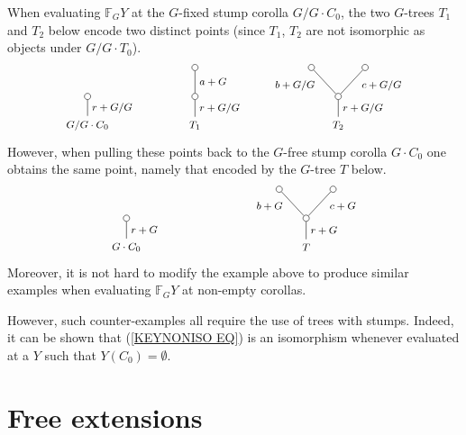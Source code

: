 \documentclass[a4paper,10pt]{article}%
\begin{document}
\begin{remark}
	When evaluating $\mathbb{F}_G Y$ at the $G$-fixed stump corolla $G/G \cdot C_0$, the two $G$-trees $T_1$ and $T_2$ below encode two distinct points (since $T_1$, $T_2$ are not isomorphic as objects under $G/G\cdot T_0$).
\[
\begin{tikzpicture}[grow=up,auto,level distance=2.3em,every node/.style = {font=\footnotesize},dummy/.style={circle,draw,inner sep=0pt,minimum size=1.75mm}]
	\node at (0,0) {$G/G \cdot C_0$}
		child{
			node [dummy] {}
		edge from parent node [swap] {$r+G/G$}};
	\node at (3,0) {$T_1$}
		child{node [dummy] {}
			child{node [dummy] {}
			edge from parent node [swap] {$a+G$}}
		edge from parent node [swap] {$r+G/G$}};
	\node at (7,0) {$T_2$}
		child{node [dummy] {}
			child{node [dummy] {}
			edge from parent node [swap,near end] {$c+G/G$}}
			child{node [dummy] {}
			edge from parent node [near end] {$b+G/G$}}
		edge from parent node [swap] {$r+G/G$}};
\end{tikzpicture}
\]
However, when pulling these points back to the $G$-free stump corolla $G \cdot C_0$ one obtains the same point, namely that encoded by the $G$-tree $T$ below.
\[
\begin{tikzpicture}[grow=up,auto,level distance=2.3em,every node/.style = {font=\footnotesize},dummy/.style={circle,draw,inner sep=0pt,minimum size=1.75mm}]
	\node at (0,0) {$G \cdot C_0$}
		child{
			node [dummy] {}
		edge from parent node [swap] {$r+G$}};
	\node at (5,0) {$T$}
		child{node [dummy] {}
			child{node [dummy] {}
			edge from parent node [swap,near end] {$c+G$}}
			child{node [dummy] {}
			edge from parent node [near end] {$b+G$}}
		edge from parent node [swap] {$r+G$}};
\end{tikzpicture}
\]
Moreover, it is not hard to modify the example above to produce similar examples when evaluating $\mathbb{F}_GY$ at non-empty corollas. 

However, such counter-examples all require the use of trees with stumps. Indeed, it can be shown that (\ref{KEYNONISO EQ})
is an isomorphism whenever evaluated at a $Y$ such that $Y(C_0)=\emptyset$.
\end{remark}

\section{Free extensions}
\label{FREE_EXTENSIONS_SECTION}
\end{document}

